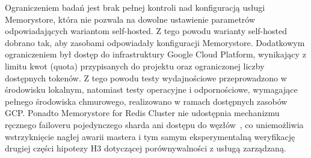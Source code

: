 Ograniczeniem badań jest brak pełnej kontroli nad konfiguracją usługi Memorystore, która nie pozwala na dowolne ustawienie parametrów odpowiadających wariantom self-hosted. Z tego powodu warianty self-hosted dobrano tak, aby zasobami odpowiadały konfiguracji Memorystore. Dodatkowym ograniczeniem był dostęp do infrastruktury Google Cloud Platform, wynikający z limitu kwot (quota) przypisanych do projektu oraz ograniczonej liczby dostępnych tokenów. Z tego powodu testy wydajnościowe przeprowadzono w środowisku lokalnym, natomiast testy operacyjne i odpornościowe, wymagające pełnego środowiska chmurowego, realizowano w ramach dostępnych zasobów GCP. Ponadto Memorystore for Redis Cluster nie udostępnia mechanizmu ręcznego failoveru pojedynczego sharda ani dostępu do węzłów~\cite{gcpMemorystoreHA}, co uniemożliwia wstrzyknięcie nagłej awarii mastera i tym samym eksperymentalną weryfikację drugiej części hipotezy H3 dotyczącej porównywalności z usługą zarządzaną.


